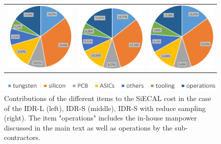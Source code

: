 \begin{figure}[h!]
\begin{tabular}{ccc}
\includegraphics[width=0.3\hsize]{Costing/Eclg_sharing.PNG}&
\includegraphics[width=0.3\hsize]{Costing/Ecsm_sharing.PNG}&
\includegraphics[width=0.3\hsize]{Costing/Ec26_sharing.PNG}
\end{tabular}
\includegraphics[width=0.8\hsize]{Costing/Ec_sharing_items.PNG}
\centering
\caption{Contributions of the different items to the SiECAL cost in the case of the IDR-L (left), IDR-S (middle), IDR-S with reduce sampling (right). The item "operations" includes the in-house manpower discussed in the main text as well as operations by the sub-contractors.}
\label{fig:det:ECal_Si_cost_sharings}
\end{figure}



